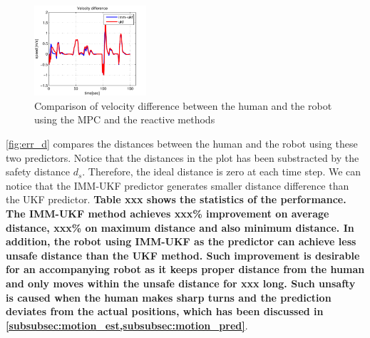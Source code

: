 \documentclass[letterpaper, 10 pt, conference]{ieeeconf}
\begin{document}
\begin{figure}
\centering
\includegraphics[width=0.37\textwidth]{figures/vel_diff.pdf}
\caption{Comparison of velocity difference between the human and the robot using the MPC and the reactive methods}
\label{fig:err_v}
\end{figure}
\cref{fig:err_d} compares the distances between the human and the robot using these two predictors.
Notice that the distances in the plot has been substracted by the safety distance $d_s$.
Therefore, the ideal distance is zero at each time step.
We can notice that the IMM-UKF predictor generates smaller distance difference than the UKF predictor.
\textbf{Table xxx shows the statistics of the performance. The IMM-UKF method achieves xxx\% improvement on average distance, xxx\% on maximum distance and also minimum distance. In addition, the robot using IMM-UKF as the predictor can achieve less unsafe distance than the UKF method. Such improvement is desirable for an accompanying robot as it keeps proper distance from the human and only moves within the unsafe distance for xxx long. Such unsafty is caused when the human makes sharp turns and the prediction deviates from the actual positions, which has been discussed in \cref{subsubsec:motion_est,subsubsec:motion_pred}}.
\end{document}
